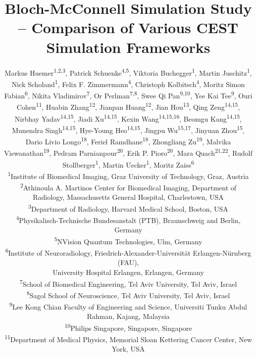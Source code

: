 \documentclass[11pt,a4paper]{article}
\newcommand{\affil}[1]{\textsuperscript{#1}}
\begin{document}
\title{Bloch-McConnell Simulation Study – Comparison of Various CEST Simulation Frameworks}

\author{\parbox{\textwidth}{\centering
Markus Huemer\affil{1,2,3},
Patrick Schuenke\affil{4,5},
Viktoria Buchegger\affil{1},
Martin Juschitz\affil{1},
Nick Scholand\affil{1},
Felix F. Zimmermann\affil{4},
Christoph Kolbitsch\affil{4},
Moritz Simon Fabian\affil{6},
Nikita Vladimirov\affil{7},
Or Perlman\affil{7,8},
Swee Qi Pan\affil{9,10},
Yee Kai Tee\affil{9},
Ouri Cohen\affil{11},
Huabin Zhang\affil{12},
Jianpan Huang\affil{12},
Jian Hou\affil{13},
Qing Zeng\affil{14,15},
Nirbhay Yadav\affil{14,15},
Jiadi Xu\affil{14,15},
Kexin Wang\affil{14,15,16},
Beomgu Kang\affil{14,15},
Munendra Singh\affil{14,15},
Hye-Young Heo\affil{14,15},
Jingpu Wu\affil{15,17},
Jinyuan Zhou\affil{15},
Dario Livio Longo\affil{18},
Feriel Ramdhane\affil{18},
Zhongliang Zu\affil{19},
Malvika Viswanathan\affil{19},
Pedram Parnianpour\affil{20},
Erik P. Pioro\affil{20},
Mara Quach\affil{21,22},
Rudolf Stollberger\affil{1},
Martin Uecker\affil{1},
Moritz Zaiss\affil{6}
\\[1ex]
\small \affil{1}Institute of Biomedical Imaging, Graz University of Technology, Graz, Austria\\
\small \affil{2}Athinoula A. Martinos Center for Biomedical Imaging, Department of Radiology, Massachusetts General Hospital, Charlestown, USA\\
\small \affil{3}Department of Radiology, Harvard Medical School, Boston, USA\\
\small \affil{4}Physikalisch-Technische Bundesanstalt (PTB), Braunschweig and Berlin, Germany\\
\small \affil{5}NVision Quantum Technologies, Ulm, Germany\\
\small \affil{6}Institute of Neuroradiology, Friedrich-Alexander-Universität Erlangen-Nürnberg (FAU),\\
\small University Hospital Erlangen, Erlangen, Germany\\
\small \affil{7}School of Biomedical Engineering, Tel Aviv University, Tel Aviv, Israel\\
\small \affil{8}Sagol School of Neuroscience, Tel Aviv University, Tel Aviv, Israel\\
\small \affil{9}Lee Kong Chian Faculty of Engineering and Science, Universiti Tunku Abdul Rahman, Kajang, Malaysia\\
\small \affil{10}Philips Singapore, Singapore, Singapore\\
\small \affil{11}Department of Medical Physics, Memorial Sloan Kettering Cancer Center, New York, USA\\
}}
\end{document}
